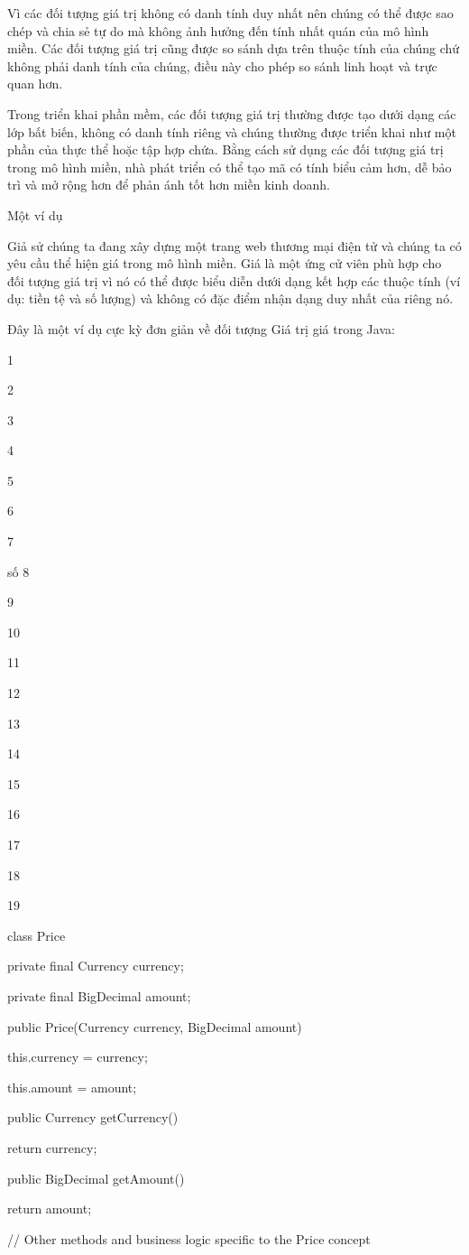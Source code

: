 Vì các đối tượng giá trị không có danh tính duy nhất nên chúng có thể được sao chép và chia sẻ tự do mà không ảnh hưởng đến tính nhất quán của mô hình miền. Các đối tượng giá trị cũng được so sánh dựa trên thuộc tính của chúng chứ không phải danh tính của chúng, điều này cho phép so sánh linh hoạt và trực quan hơn.

Trong triển khai phần mềm, các đối tượng giá trị thường được tạo dưới dạng các lớp bất biến, không có danh tính riêng và chúng thường được triển khai như một phần của thực thể hoặc tập hợp chứa. Bằng cách sử dụng các đối tượng giá trị trong mô hình miền, nhà phát triển có thể tạo mã có tính biểu cảm hơn, dễ bảo trì và mở rộng hơn để phản ánh tốt hơn miền kinh doanh.

Một ví dụ

Giả sử chúng ta đang xây dựng một trang web thương mại điện tử và chúng ta có yêu cầu thể hiện giá trong mô hình miền. Giá là một ứng cử viên phù hợp cho đối tượng giá trị vì nó có thể được biểu diễn dưới dạng kết hợp các thuộc tính (ví dụ: tiền tệ và số lượng) và không có đặc điểm nhận dạng duy nhất của riêng nó.

Đây là một ví dụ cực kỳ đơn giản về đối tượng Giá trị giá trong Java:

1

2

3

4

5

6

7

số 8

9

10

11

12

13

14

15

16

17

18

19

class Price {

private final Currency currency;

private final BigDecimal amount;

public Price(Currency currency, BigDecimal amount) {

this.currency = currency;

this.amount = amount;

}

public Currency getCurrency() {

return currency;

}

public BigDecimal getAmount() {

return amount;

}

// Other methods and business logic specific to the Price concept

}

